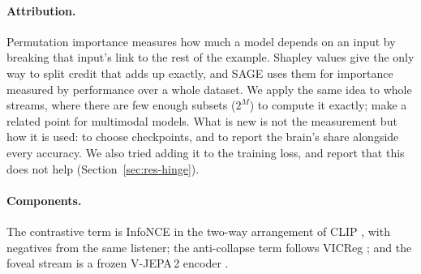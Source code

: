 \paragraph{Attribution.}
Permutation importance \citep{breiman2001,fisher2019} measures how much a model
depends on an input by breaking that input's link to the rest of the example.
Shapley values \citep{shapley1953,lundberg2017} give the only way to split credit
that adds up exactly, and SAGE \citep{covert2020} uses them for importance measured
by performance over a whole dataset. We apply the same idea to whole streams,
where there are few enough subsets ($2^M$) to compute it exactly;
\citet{hessel2020} make a related point for multimodal models. What is new is not
the measurement but how it is used: to choose checkpoints, and to report the
brain's share alongside every accuracy. We also tried adding it to the training
loss, and report that this does not help (Section~\ref{sec:res-hinge}).

\paragraph{Components.}
The contrastive term is InfoNCE \citep{oord2018} in the two-way arrangement of
CLIP \citep{radford2021clip}, with negatives from the same listener; the
anti-collapse term follows VICReg \citep{bardes2022vicreg}; and the foveal stream
is a frozen V-JEPA\,2 encoder \citep{assran2025vjepa2}.
